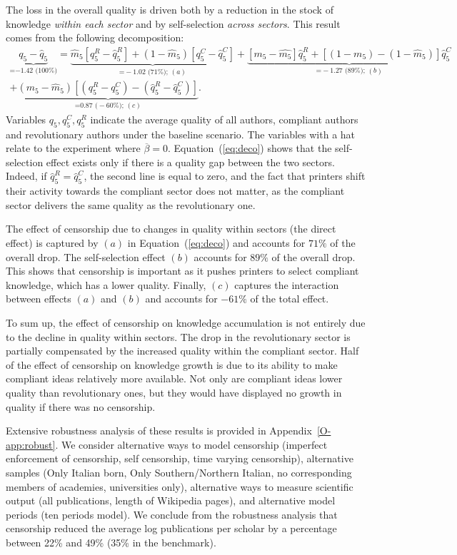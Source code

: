 The loss in  the overall quality is  driven both by a reduction in the stock of knowledge \textit{within each sector} and by self-selection \textit{across sectors}.   This result comes from the following decomposition:
\begin{multline}\label{eq:deco}
\underbrace{q_5-\hat{q}_5}_{\text{=$-$1.42 (100\%)}}=\underbrace{\hat{m}_5 [{q}^R_5-\hat{q}^R_5]+(1-\hat{m}_5)[q^C_5-\hat{q}^C_5]}_{\text{=$-$1.02 (71\%); $(a)$}}+
\underbrace{[m_5-\hat{m_5}]\hat{q}^R_5+[(1-m_5)-(1-\hat{m}_5)]\hat{q}^C_5}_{\text{=$-$1.27 (89\%); $(b)$}}\\
+\underbrace{(m_5-\hat{m}_5) [(q^R_5-q^C_5)-(\hat{q}^R_5-\hat{q}^C_5)]}_{\text{=0.87 ($-$60\%); $(c)$}}.
\end{multline}
Variables $q_5, q^C_5, q^R_5$ indicate the average quality of all authors, compliant authors and revolutionary authors under the baseline scenario. The variables with a hat relate to the experiment where $\overline{\beta}=0$. Equation~(\ref{eq:deco}) shows that the self-selection effect exists only if there is a quality gap between the two sectors. Indeed, if $\hat{q}^R_5=\hat{q}^C_5$, the second line is equal to zero, and the fact that printers shift their activity towards the compliant sector does not matter, as the compliant sector delivers the same quality as the revolutionary one.

The effect of censorship due to changes in quality within sectors (the direct effect) is captured by $(a)$ in Equation~(\ref{eq:deco}) and accounts for $71\%$ of the overall drop. The self-selection effect $(b)$ accounts for $89\%$ of the overall drop. This shows that censorship is important as it pushes printers to select compliant knowledge, which has a lower quality. Finally, $(c)$ captures the interaction between effects $(a)$ and $(b)$ and accounts for $-61\%$ of the total effect.


To sum up, the effect of censorship on knowledge accumulation is not entirely due to the decline in quality within sectors. The drop in the revolutionary sector is partially compensated by the increased quality within the compliant sector. Half of the effect of censorship on knowledge growth is due to its ability to make compliant ideas relatively more available. Not only are compliant ideas lower quality than revolutionary ones, but they would have displayed no growth in quality if there was no censorship.

Extensive robustness analysis of these results is provided in Appendix~\ref{O-app:robust}. We consider alternative ways to model censorship (imperfect enforcement of censorship, self censorship, time varying censorship), alternative samples (Only Italian born, Only Southern/Northern Italian, no corresponding members of academies, universities only), alternative ways to measure scientific output (all publications, length of Wikipedia pages), and alternative model periods (ten periods model).
 We conclude from the robustness analysis that censorship reduced  the average log publications per scholar by a percentage between 22\% and 49\% (35\% in the benchmark).


